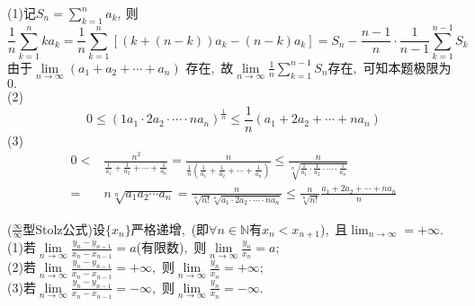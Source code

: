\begin{solution}
	(1)记$S_n=\sum_{k=1}^{n}a_k,\ $则
	$$\frac{1}{n}\sum_{k=1}^{n}ka_k=\frac{1}{n}\sum_{k=1}^{n}[(k+(n-k))a_k-(n-k)a_k]=S_n-\frac{n-1}{n}\cdot\frac{1}{n-1}\sum_{k=1}^{n-1}S_k$$
	由于$\lim\limits_{n \rightarrow \infty}\left(a_{1}+a_{2}+\cdots+a_{n}\right) $ 存在,\ 故$\lim\limits_{n\rightarrow\infty}\frac{1}{n}\sum_{k=1}^{n-1}S_n$存在,\ 可知本题极限为$0.$\\
	(2)
	$$0\leqslant(1a_1\cdot 2a_2\cdot \cdots \cdot na_n)^{\frac{1}{n}}\leqslant\frac{1}{n}(a_1+2a_2+\cdots+na_n)$$
	(3)
	$$\begin{aligned}
		0<&\frac{n^2}{\frac{1}{a_1}+\frac{1}{a_2}+\cdots+\frac{1}{a_n}}=\frac{n}{\frac{1}{n}(\frac{1}{a_1}+\frac{1}{a_2}+\cdots+\frac{1}{a_n})}\leqslant\frac{n}{\sqrt[n]{\frac{1}{a_1}\cdot\frac{1}{a_2}\cdot\cdots\cdot\frac{1}{a_n}}}\\
		=&n\sqrt[n]{a_1a_2\cdots a_n}=\frac{n}{\sqrt[n]{n!}\sqrt[n]{a_1\cdot 2a_2\cdot\cdots\cdot na_n}}\leqslant\frac{n}{\sqrt[n]{n!}}\frac{a_1+2a_2+\cdots+na_n}{n}
	\end{aligned}$$
\end{solution}
\newpage
\begin{problem}
	($\frac{\infty}{\infty}$型Stolz公式)设$\{x_n\}$严格递增,\ (即$\forall n\in\mathbb{N}$有$x_n<x_{n+1}$),\ 且$\lim_{n\rightarrow\infty}=+\infty.$\\
	(1)若$\lim\limits_{n\rightarrow\infty}\frac{y_n-y_{n-1}}{x_n-x_{n-1}}=a$(有限数),\ 则$\lim\limits_{n\rightarrow\infty}\frac{y_n}{x_n}=a;$\\
	(2)若$\lim\limits_{n\rightarrow\infty}\frac{y_n-y_{n-1}}{x_n-x_{n-1}}=+\infty$,\ 则$\lim\limits_{n\rightarrow\infty}\frac{y_n}{x_n}=+\infty;$\\
	(3)若$\lim\limits_{n\rightarrow\infty}\frac{y_n-y_{n-1}}{x_n-x_{n-1}}=-\infty$,\ 则$\lim\limits_{n\rightarrow\infty}\frac{y_n}{x_n}=-\infty.$
\end{problem}

